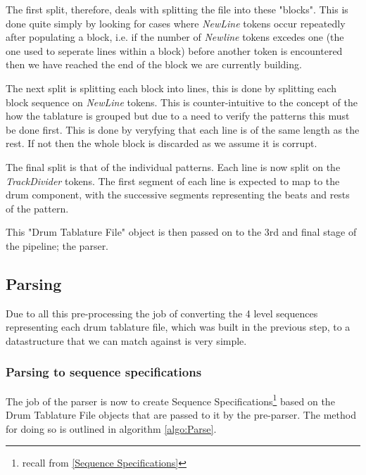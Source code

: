 \documentclass[12pt,twoside,notitlepage]{report}
\begin{document}
			The first split, therefore, deals with splitting the file into these "blocks". This is done quite simply by looking for cases where \emph{NewLine} tokens occur repeatedly after populating a block, i.e. if the number of \emph{Newline} tokens excedes one (the one used to seperate lines within a block) before another token is encountered then we have reached the end of the block we are currently building.
			
			The next split is splitting each block into lines, this is done by splitting each block sequence on \emph{NewLine} tokens. This is counter-intuitive to the concept of the how the tablature is grouped but due to a need to verify the patterns this must be done first. This is done by veryfying that each line is of the same length as the rest. If not then the whole block is discarded as we assume it is corrupt.
			
			The final split is that of the individual patterns. Each line is now split on the \emph{TrackDivider} tokens. The first segment of each line is expected to map to the drum component, with the successive segments representing the beats and rests of the pattern.
			
			
			This "Drum Tablature File" object is then passed on to the 3rd and final stage of the pipeline; the parser.
			
		\subsection{Parsing}\label{subsec:Parsing}
			Due to all this pre-processing the job of converting the 4 level sequences representing each drum tablature file, which was built in the previous step, to a datastructure that we can match against is very simple.
			
			
				\subsubsection{Parsing to sequence specifications}
				
				The job of the parser is now to create Sequence Specifications\footnote{recall from \ref{Sequence Specifications}} based on the Drum Tablature File objects that are passed to it by the pre-parser. The method for doing so is outlined in algorithm \ref{algo:Parse}.
				
\end{document}
